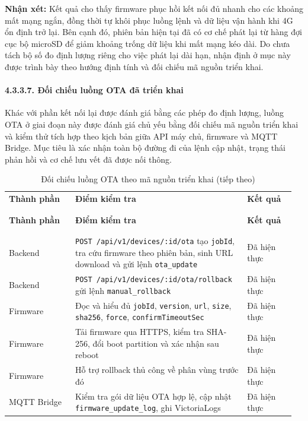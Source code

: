 \documentclass[a4paper]{extarticle}
\newcommand{\thesissettableid}[2]{%
  \renewcommand{\thetable}{#1}%
  \renewcommand{\theHtable}{#2}%
}
\begin{document}
\textbf{Nhận xét:} Kết quả cho thấy firmware phục hồi kết nối đủ nhanh
cho các khoảng mất mạng ngắn, đồng thời tự khôi phục luồng lệnh và
dữ liệu vận hành khi 4G ổn định trở lại. Bên cạnh đó, phiên bản hiện tại đã có
cơ chế phát lại từ hàng đợi cục bộ microSD để giảm khoảng trống dữ liệu khi
mất mạng kéo dài. Do chưa tách bộ số đo định lượng riêng cho việc phát lại dài
hạn, nhận định ở mục này được trình bày theo hướng định tính và đối
chiếu mã nguồn triển khai.

\paragraph{4.3.3.7. Đối chiếu luồng OTA đã triển
khai}\label{4337-ux111ux1ed1i-chiux1ebfu-luux1ed3ng-ota-ux111uxe3-triux1ec3n-khai}

Khác với phần kết nối lại được đánh giá bằng các phép đo định lượng,
luồng OTA ở giai đoạn này được đánh giá chủ yếu bằng đối chiếu mã nguồn
triển khai và kiểm thử tích hợp theo kịch bản giữa API máy chủ, firmware
và MQTT Bridge. Mục tiêu là xác nhận toàn bộ đường đi của lệnh cập nhật,
trạng thái phản hồi và cơ chế lưu vết đã được nối thông.


{\thesissettableid{4.25A}{tab-ch4-oi-chieu-luong-ota-theo-ma-nguon-trien-khai}
\def\LTcaptype{table}
\begin{longtable}{|L{0.224\linewidth}|L{0.580\linewidth}|L{0.160\linewidth}|}
\caption{Đối chiếu mức độ hoàn thiện luồng OTA theo mã nguồn và kiểm thử tích hợp}\label{tab:ch4-oi-chieu-luong-ota-theo-ma-nguon-trien-khai}\\
\hline \textbf{Thành phần} & \textbf{Điểm kiểm tra} & \textbf{Kết quả} \\
\\\hline
\endfirsthead
\caption[]{Đối chiếu luồng OTA theo mã nguồn triển khai (tiếp theo)}\\
\hline \textbf{Thành phần} & \textbf{Điểm kiểm tra} & \textbf{Kết quả} \\
\\\hline
\endhead
\\\hline
\endfoot
\endlastfoot
Backend & \nolinkurl{POST /api/v1/devices/:id/ota} tạo \texttt{jobId}, tra
cứu firmware theo phiên bản, sinh URL download và gửi lệnh
\texttt{ota\_update} & Đã hiện thực \\\hline
Backend & \nolinkurl{POST /api/v1/devices/:id/ota/rollback} gửi lệnh
\texttt{manual\_rollback} & Đã hiện thực \\\hline
Firmware & Đọc và hiểu đủ \texttt{jobId}, \texttt{version}, \texttt{url},
\texttt{size}, \texttt{sha256}, \texttt{force},
\texttt{confirmTimeoutSec} & Đã hiện thực \\\hline
Firmware & Tải firmware qua HTTPS, kiểm tra SHA-256, đổi boot partition
và xác nhận sau reboot & Đã hiện thực \\\hline
Firmware & Hỗ trợ rollback thủ công về phân vùng trước đó & Đã hiện
thực \\\hline
MQTT Bridge & Kiểm tra gói dữ liệu OTA hợp lệ, cập nhật
\texttt{firmware\_update\_log}, ghi VictoriaLogs & Đã hiện thực \\\hline
\end{longtable}
}
\end{document}

